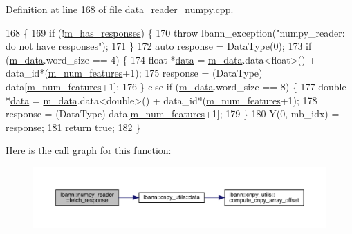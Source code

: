 Definition at line 168 of file data\+\_\+reader\+\_\+numpy.\+cpp.


\begin{DoxyCode}
168                                                                           \{
169   \textcolor{keywordflow}{if} (!\hyperlink{classlbann_1_1numpy__reader_a7567338be86dff81afece19d031a942d}{m\_has\_responses}) \{
170     \textcolor{keywordflow}{throw} lbann\_exception(\textcolor{stringliteral}{"numpy\_reader: do not have responses"});
171   \}
172   \textcolor{keyword}{auto} response = DataType(0);
173   \textcolor{keywordflow}{if} (\hyperlink{classlbann_1_1numpy__reader_a6d43a1eae0fedb6fa237b24cef8f37fa}{m\_data}.word\_size == 4) \{
174     \textcolor{keywordtype}{float} *\hyperlink{namespacelbann_1_1cnpy__utils_a9ac86d96ccb1f8b4b2ea16441738781f}{data} = \hyperlink{classlbann_1_1numpy__reader_a6d43a1eae0fedb6fa237b24cef8f37fa}{m\_data}.data<\textcolor{keywordtype}{float}>() + data\_id*(\hyperlink{classlbann_1_1numpy__reader_aef25f95077f565fa9616ec353b93f675}{m\_num\_features}+1);
175     response = (DataType) data[\hyperlink{classlbann_1_1numpy__reader_aef25f95077f565fa9616ec353b93f675}{m\_num\_features}+1];
176   \} \textcolor{keywordflow}{else} \textcolor{keywordflow}{if} (\hyperlink{classlbann_1_1numpy__reader_a6d43a1eae0fedb6fa237b24cef8f37fa}{m\_data}.word\_size == 8) \{
177     \textcolor{keywordtype}{double} *\hyperlink{namespacelbann_1_1cnpy__utils_a9ac86d96ccb1f8b4b2ea16441738781f}{data} = \hyperlink{classlbann_1_1numpy__reader_a6d43a1eae0fedb6fa237b24cef8f37fa}{m\_data}.data<\textcolor{keywordtype}{double}>() + data\_id*(\hyperlink{classlbann_1_1numpy__reader_aef25f95077f565fa9616ec353b93f675}{m\_num\_features}+1);
178     response = (DataType) data[\hyperlink{classlbann_1_1numpy__reader_aef25f95077f565fa9616ec353b93f675}{m\_num\_features}+1];
179   \}
180   Y(0, mb\_idx) = response;
181   \textcolor{keywordflow}{return} \textcolor{keyword}{true};
182 \}
\end{DoxyCode}
Here is the call graph for this function\+:\nopagebreak
\begin{figure}[H]
\begin{center}
\leavevmode
\includegraphics[width=350pt]{classlbann_1_1numpy__reader_ad7c3a680426ffcf467d74ba3a5e6eb20_cgraph}
\end{center}
\end{figure}
